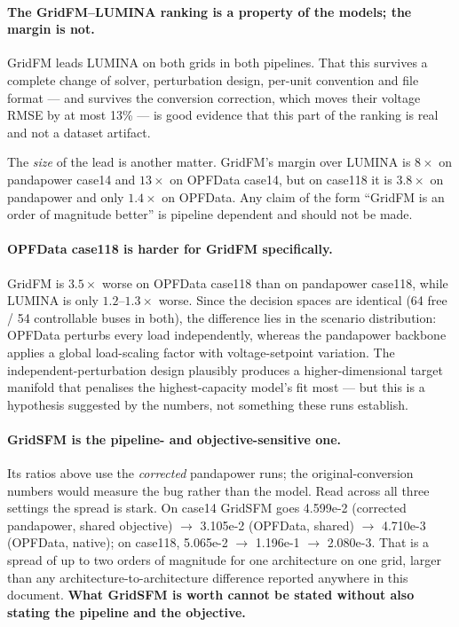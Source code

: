 \documentclass[10pt]{article}
\begin{document}
\paragraph{The GridFM--LUMINA ranking is a property of the models; the margin is
not.} GridFM leads LUMINA on both grids in both pipelines. That this survives a
complete change of solver, perturbation design, per-unit convention and file
format --- and survives the conversion correction, which moves their voltage
RMSE by at most 13\% --- is good evidence that this part of the ranking is real
and not a dataset artifact.

The \emph{size} of the lead is another matter. GridFM's margin over LUMINA is
\(8\times\) on pandapower case14 and \(13\times\) on OPFData case14, but on
case118 it is \(3.8\times\) on pandapower and only \(1.4\times\) on OPFData. Any
claim of the form ``GridFM is an order of magnitude better'' is pipeline
dependent and should not be made.

\paragraph{OPFData case118 is harder for GridFM specifically.} GridFM is
\(3.5\times\) worse on OPFData case118 than on pandapower case118, while LUMINA
is only \(1.2\)--\(1.3\times\) worse. Since the decision spaces are identical
(64 free / 54 controllable buses in both), the difference lies in the scenario
distribution: OPFData perturbs every load independently, whereas the pandapower
backbone applies a global load-scaling factor with voltage-setpoint variation.
The independent-perturbation design plausibly produces a higher-dimensional
target manifold that penalises the highest-capacity model's fit most --- but
this is a hypothesis suggested by the numbers, not something these runs
establish.

\paragraph{GridSFM is the pipeline- and objective-sensitive one.} Its ratios
above use the \emph{corrected} pandapower runs; the original-conversion numbers
would measure the bug rather than the model. Read across all three settings the
spread is stark. On case14 GridSFM goes 4.599e-2 (corrected pandapower,
shared objective) \(\rightarrow\) 3.105e-2 (OPFData, shared) \(\rightarrow\)
4.710e-3 (OPFData, native); on case118, 5.065e-2 \(\rightarrow\) 1.196e-1
\(\rightarrow\) 2.080e-3. That is a spread of up to two orders of magnitude for
one architecture on one grid, larger than any architecture-to-architecture
difference reported anywhere in this document. \textbf{What GridSFM is worth
cannot be stated without also stating the pipeline and the objective.}
\end{document}
